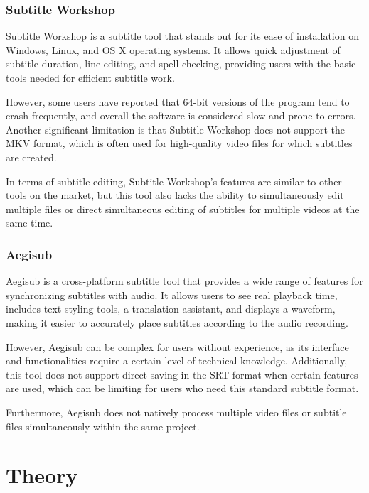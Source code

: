 \subsection{Subtitle Workshop}

Subtitle Workshop is a subtitle tool that stands out for its ease of installation on Windows, Linux, and OS X operating systems. It allows quick adjustment of subtitle duration, line editing, and spell checking, providing users with the basic tools needed for efficient subtitle work.

However, some users have reported that 64-bit versions of the program tend to crash frequently, and overall the software is considered slow and prone to errors. Another significant limitation is that Subtitle Workshop does not support the MKV format, which is often used for high-quality video files for which subtitles are created.

In terms of subtitle editing, Subtitle Workshop's features are similar to other tools on the market, but this tool also lacks the ability to simultaneously edit multiple files or direct simultaneous editing of subtitles for multiple videos at the same time.

\subsection{Aegisub}

Aegisub is a cross-platform subtitle tool that provides a wide range of features for synchronizing subtitles with audio. It allows users to see real playback time, includes text styling tools, a translation assistant, and displays a waveform, making it easier to accurately place subtitles according to the audio recording.

However, Aegisub can be complex for users without experience, as its interface and functionalities require a certain level of technical knowledge. Additionally, this tool does not support direct saving in the SRT format when certain features are used, which can be limiting for users who need this standard subtitle format.

Furthermore, Aegisub does not natively process multiple video files or subtitle files simultaneously within the same project.

\chapter{Theory}

